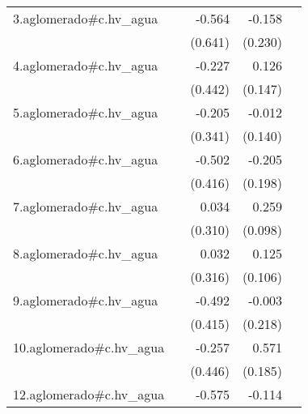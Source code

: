 {\begin{longtable}{l*{4}{D{.}{.}{-1}}}
\addlinespace
3.aglomerado#c.hv\_agua&                     &      -0.564         &      -0.158         &                     \\
            &                     &     (0.641)         &     (0.230)         &                     \\
\addlinespace
4.aglomerado#c.hv\_agua&                     &      -0.227         &       0.126         &                     \\
            &                     &     (0.442)         &     (0.147)         &                     \\
\addlinespace
5.aglomerado#c.hv\_agua&                     &      -0.205         &      -0.012         &                     \\
            &                     &     (0.341)         &     (0.140)         &                     \\
\addlinespace
6.aglomerado#c.hv\_agua&                     &      -0.502         &      -0.205         &                     \\
            &                     &     (0.416)         &     (0.198)         &                     \\
\addlinespace
7.aglomerado#c.hv\_agua&                     &       0.034         &       0.259\sym{**} &                     \\
            &                     &     (0.310)         &     (0.098)         &                     \\
\addlinespace
8.aglomerado#c.hv\_agua&                     &       0.032         &       0.125         &                     \\
            &                     &     (0.316)         &     (0.106)         &                     \\
\addlinespace
9.aglomerado#c.hv\_agua&                     &      -0.492         &      -0.003         &                     \\
            &                     &     (0.415)         &     (0.218)         &                     \\
\addlinespace
10.aglomerado#c.hv\_agua&                     &      -0.257         &       0.571\sym{**} &                     \\
            &                     &     (0.446)         &     (0.185)         &                     \\
\addlinespace
12.aglomerado#c.hv\_agua&                     &      -0.575         &      -0.114         &                     \\

\end{longtable}}
